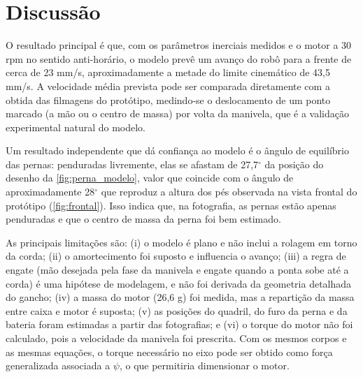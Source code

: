 \section{Discussão}
\label{sec:discussao}

O resultado principal é que, com os parâmetros inerciais medidos e o motor a 30 rpm no sentido anti-horário, o modelo prevê um avanço do robô para a frente de cerca de 23 mm/s, aproximadamente a metade do limite cinemático de 43,5 mm/s. A velocidade média prevista pode ser comparada diretamente com a obtida das filmagens do protótipo, medindo-se o deslocamento de um ponto marcado (a mão ou o centro de massa) por volta da manivela, que é a validação experimental natural do modelo.

Um resultado independente que dá confiança ao modelo é o ângulo de equilíbrio das pernas: penduradas livremente, elas se afastam de 27,7$^\circ$ da posição do desenho da \ref{fig:perna_modelo}, valor que coincide com o ângulo de aproximadamente 28$^\circ$ que reproduz a altura dos pés observada na vista frontal do protótipo (\ref{fig:frontal}). Isso indica que, na fotografia, as pernas estão apenas penduradas e que o centro de massa da perna foi bem estimado.

As principais limitações são: (i) o modelo é plano e não inclui a rolagem em torno da corda; (ii) o amortecimento foi suposto e influencia o avanço; (iii) a regra de engate (mão desejada pela fase da manivela e engate quando a ponta sobe até a corda) é uma hipótese de modelagem, e não foi derivada da geometria detalhada do gancho; (iv) a massa do motor (26,6 g) foi medida, mas a repartição da massa entre caixa e motor é suposta; (v) as posições do quadril, do furo da perna e da bateria foram estimadas a partir das fotografias; e (vi) o torque do motor não foi calculado, pois a velocidade da manivela foi prescrita. Com os mesmos corpos e as mesmas equações, o torque necessário no eixo pode ser obtido como força generalizada associada a $\psi$, o que permitiria dimensionar o motor.
